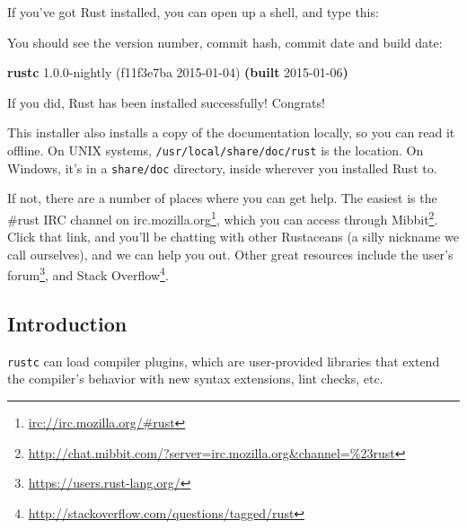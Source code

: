 \documentclass[a4paper,]{book}
\newenvironment{Shaded}{\begin{snugshade}}{\end{snugshade}}
\newcommand{\KeywordTok}[1]{\textcolor[rgb]{0.13,0.29,0.53}{\textbf{{#1}}}}
\newcommand{\NormalTok}[1]{{#1}}
\renewcommand{\href}[2]{#2\footnote{\url{#1}}}
\begin{document}
If you've got Rust installed, you can open up a shell, and type this:

\begin{Shaded}
\end{Shaded}

You should see the version number, commit hash, commit date and build
date:

\begin{Shaded}
\begin{Highlighting}[]
\KeywordTok{rustc} \NormalTok{1.0.0-nightly (f11f3e7ba 2015-01-04) }\KeywordTok{(built} \NormalTok{2015-01-06}\KeywordTok{)}
\end{Highlighting}
\end{Shaded}

If you did, Rust has been installed successfully! Congrats!

This installer also installs a copy of the documentation locally, so you
can read it offline. On UNIX systems, \texttt{/usr/local/share/doc/rust}
is the location. On Windows, it's in a \texttt{share/doc} directory,
inside wherever you installed Rust to.

If not, there are a number of places where you can get help. The easiest
is \href{irc://irc.mozilla.org/\#rust}{the \#rust IRC channel on
irc.mozilla.org}, which you can access through
\href{http://chat.mibbit.com/?server=irc.mozilla.org\&channel=\%23rust}{Mibbit}.
Click that link, and you'll be chatting with other Rustaceans (a silly
nickname we call ourselves), and we can help you out. Other great
resources include \href{https://users.rust-lang.org/}{the user's forum},
and \href{http://stackoverflow.com/questions/tagged/rust}{Stack
Overflow}.


\subsection{Introduction}\label{introduction-2}

\texttt{rustc} can load compiler plugins, which are user-provided
libraries that extend the compiler's behavior with new syntax
extensions, lint checks, etc.
\end{document}
